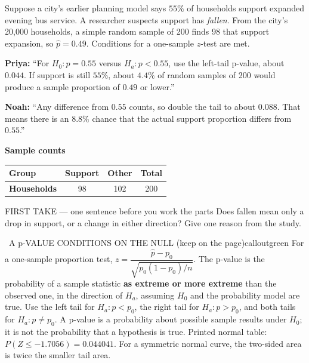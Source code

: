 \documentclass[11pt]{article}
\begin{document}


Suppose a city's earlier planning model says $55\%$ of households support expanded evening bus service. A researcher suspects support has \emph{fallen}. From the city's 20{,}000 households, a simple random sample of 200 finds 98 that support expansion, so $\hat p=0.49$. Conditions for a one-sample $z$-test are met.\par\smallskip \textbf{Priya:} ``For $H_0:p=0.55$ versus $H_a:p<0.55$, use the left-tail p-value, about $0.044$. If support is still $55\%$, about $4.4\%$ of random samples of 200 would produce a sample proportion of $0.49$ or lower.''\par \textbf{Noah:} ``Any difference from $0.55$ counts, so double the tail to about $0.088$. That means there is an $8.8\%$ chance that the actual support proportion differs from $0.55$.''\par
\begin{center}
\textbf{Sample counts}\par\smallskip
\begin{tabular}{|l|c|c|c|}
\hline
\textbf{Group} & \textbf{Support} & \textbf{Other} & \textbf{Total} \\ \hline
\textbf{Households} & 98 & 102 & 200 \\ \hline
\end{tabular}
\end{center}
\begin{firsttakebox}{FIRST TAKE --- one sentence before you work the parts}
Does fallen mean only a drop in support, or a change in either direction? Give one reason from the study.
\workspace{0.9in}
\end{firsttakebox}

\begin{callout}{\IconBook\ A p-VALUE CONDITIONS ON THE NULL (keep on the page)}{calloutgreen}
For a one-sample proportion test,
$z=\dfrac{\hat p-p_0}{\sqrt{p_0(1-p_0)/n}}$.
The p-value is the probability of a sample statistic \textbf{as extreme or more extreme} than the observed one,
in the direction of $H_a$, assuming $H_0$ and the probability model are true. Use the left tail for $H_a:p<p_0$,
the right tail for $H_a:p>p_0$, and both tails for $H_a:p\neq p_0$.
A p-value is a probability about possible sample results under $H_0$; it is not the probability that a hypothesis is true.
Printed normal table: $P(Z\leq-1.7056)=0.044041$. For a symmetric normal curve, the two-sided area is twice the smaller tail area.
\end{callout}
\end{document}
